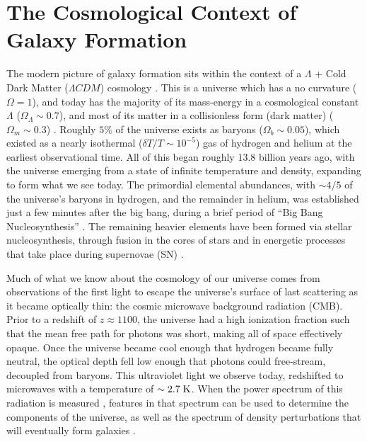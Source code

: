 \section{The Cosmological Context of Galaxy Formation}
The modern picture of galaxy formation sits within the context of a $\Lambda$ +
Cold Dark Matter  ($\Lambda CDM$) cosmology
\citep{Rees1977,White1978,Blumenthal1984,Mo1998}.  This is a universe which has
a no curvature ($\Omega = 1$), and today has the majority of its mass-energy in
a cosmological constant $\Lambda$ ($\Omega_\Lambda \sim 0.7$), and most of its
matter in a collisionless form (dark matter) ($\Omega_m \sim 0.3$)
\citep{Planck2014}.  Roughly $5\%$ of the universe exists as baryons ($\Omega_b
\sim 0.05$), which existed as a nearly isothermal ($\delta T/T\sim10^{-5}$) gas
of hydrogen and helium at the earliest observational time.  All of this began
roughly $13.8$ billion years ago, with the universe emerging from a state of
infinite temperature and density, expanding to form what we see today.  The
primordial elemental abundances, with $\sim4/5$ of the universe's baryons in
hydrogen, and the remainder in helium, was established just a few minutes after
the big bang, during a brief period of ``Big Bang Nucleosynthesis''
\citep{Alpher1948}.  The remaining heavier elements have been formed via stellar
nucleosynthesis, through fusion in the cores of stars and in energetic processes
that take place during supernovae (SN) \citep{Wagoner1967}.

Much of what we know about the cosmology of our universe comes from observations
of the first light to escape the universe's surface of last scattering as it
became optically thin: the cosmic microwave background radiation (CMB).  Prior
to a redshift of $z\approx1100$, the universe had a high ionization fraction
such that the mean free path for photons was short, making all of space
effectively opaque.  Once the universe became cool enough that hydrogen became
fully neutral, the optical depth fell low enough that photons could free-stream,
decoupled from baryons.  This ultraviolet light we observe today, redshifted to
microwaves with a temperature of $\sim2.7\;\rm{K}$.  When the power spectrum of
this radiation is measured \citep{Spergel2003}, features in that spectrum can be
used to determine the components of the universe, as well as the spectrum of
density perturbations that will eventually form galaxies
\citep{Press1974,Peebles1980}.

